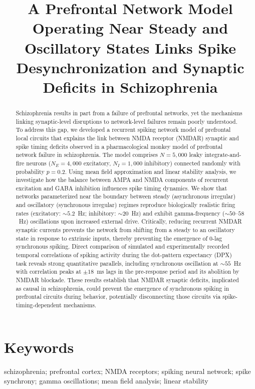 \documentclass[12pt]{article}
\title{A Prefrontal Network Model Operating Near Steady and Oscillatory States Links Spike Desynchronization and Synaptic Deficits in Schizophrenia}
\author{}
\date{}
\begin{document}
\maketitle

\begin{abstract}
Schizophrenia results in part from a failure of prefrontal networks, yet the mechanisms linking synaptic-level disruptions to network-level failures remain poorly understood. To address this gap, we developed a recurrent spiking network model of prefrontal local circuits that explains the link between NMDA receptor (NMDAR) synaptic and spike timing deficits observed in a pharmacological monkey model of prefrontal network failure in schizophrenia. The model comprises $N = 5{,}000$ leaky integrate-and-fire neurons ($N_E = 4{,}000$ excitatory, $N_I = 1{,}000$ inhibitory) connected randomly with probability $p = 0.2$. Using mean field approximation and linear stability analysis, we investigate how the balance between AMPA and NMDA components of recurrent excitation and GABA inhibition influences spike timing dynamics. We show that networks parameterized near the boundary between steady (asynchronous irregular) and oscillatory (synchronous irregular) regimes reproduce biologically realistic firing rates (excitatory: ${\sim}5.2$~Hz; inhibitory: ${\sim}20$~Hz) and exhibit gamma-frequency (${\sim}50$--$58$~Hz) oscillations upon increased external drive. Critically, reducing recurrent NMDAR synaptic currents prevents the network from shifting from a steady to an oscillatory state in response to extrinsic inputs, thereby preventing the emergence of 0-lag synchronous spiking. Direct comparison of simulated and experimentally recorded temporal correlations of spiking activity during the dot-pattern expectancy (DPX) task reveals strong quantitative parallels, including synchronous oscillation at ${\sim}55$~Hz with correlation peaks at $\pm 18$~ms lags in the pre-response period and its abolition by NMDAR blockade. These results establish that NMDAR synaptic deficits, implicated as causal in schizophrenia, could prevent the emergence of synchronous spiking in prefrontal circuits during behavior, potentially disconnecting those circuits via spike-timing-dependent mechanisms.
\end{abstract}

\section*{Keywords}
schizophrenia; prefrontal cortex; NMDA receptors; spiking neural network; spike synchrony; gamma oscillations; mean field analysis; linear stability
\end{document}
